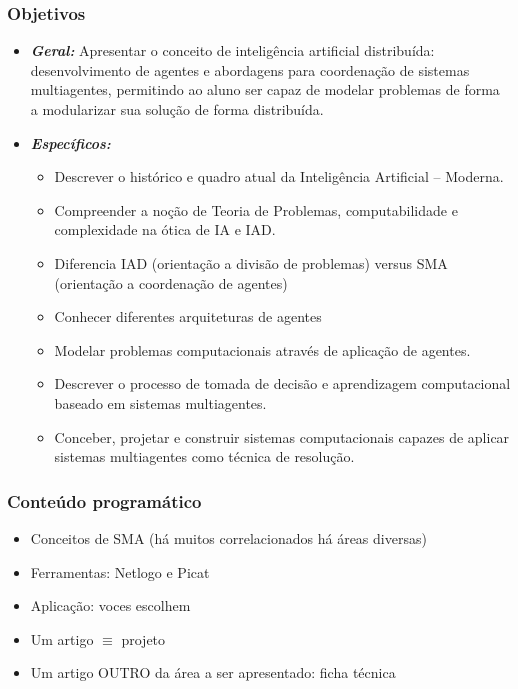 \begin{frame} [allowframebreaks=0.9]
\frametitle{Objetivos}

\begin{itemize}
\item \emph{\textbf{Geral:}} 
 Apresentar o  conceito de inteligência artificial distribuída: 
 desenvolvimento de agentes e abordagens para coordenação de sistemas multiagentes,
 permitindo ao aluno ser capaz de modelar problemas de forma a modularizar sua solução
 de forma distribuída.

\newpage
\item \emph{\textbf{Específicos:}} 

  \begin{itemize}
  \item Descrever o histórico e quadro atual da Inteligência Artificial -- Moderna. 
  \item Compreender a noção de Teoria de Problemas, computabilidade e complexidade na ótica de IA e IAD.
  \item Diferencia IAD (orientação a divisão de problemas) versus SMA (orientação a 
  coordenação de agentes)
  \item  Conhecer diferentes arquiteturas de agentes
  \item   Modelar problemas computacionais através de aplicação de agentes.
  \item   Descrever o processo de tomada de decisão e aprendizagem computacional baseado em 
  sistemas multiagentes.
  \item   Conceber, projetar e construir sistemas computacionais capazes de aplicar sistemas 
  multiagentes como técnica de resolução.
  
  \end{itemize}

\end{itemize}

\end{frame}



\begin{frame}
\frametitle{Conteúdo programático}


    \begin{itemize}
      \item Conceitos de SMA (há muitos correlacionados há áreas diversas)
      \item Ferramentas: Netlogo e Picat
      \item Aplicação: voces escolhem
      \item Um artigo $ \equiv $ projeto
      \item Um artigo OUTRO da área a ser apresentado: ficha técnica
      
    \end{itemize}
\end{frame}


